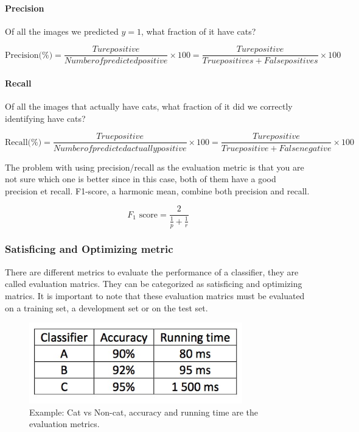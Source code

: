 \documentclass[UTF8]{article}
\begin{document}
\paragraph{Precision}
Of all the images we predicted $y = 1$, what fraction of it have cats?

$$ \text{Precision(\%)} = \frac{Ture positive}{Number of predicted positive} \times 100
= \frac{Ture positive}{True positives + False positives} \times 100 $$

\paragraph{Recall}
Of all the images that actually have cats, what fraction of it did we correctly identifying have
cats?

$$ \text{Recall(\%)} = \frac{True positive}{Number of predicted actually positive} \times 100
= \frac{Ture positive}{True positive + False negative} \times 100 $$

The problem with using precision/recall as the evaluation metric is that you are not sure which one
is better since in this case, both of them have a good precision et recall. F1-score, a harmonic
mean, combine both precision and recall.

$$ F_1\text{ score} = \frac{2}{\frac{1}{p} + \frac{1}{r}} $$

\subsubsection{Satisficing and Optimizing metric}
There are different metrics to evaluate the performance of a classifier, they are called evaluation
matrics. They can be categorized as satisficing and optimizing matrics. It is important to note
that these evaluation matrics must be evaluated on a training set, a development set or on the
test set.

\begin{figure}[htb]
    \centering
    \includegraphics[width=25em]{figures/satisficing}
    \caption{Example: Cat vs Non-cat, accuracy and running time are the evaluation metrics.}
\end{figure}
\end{document}
